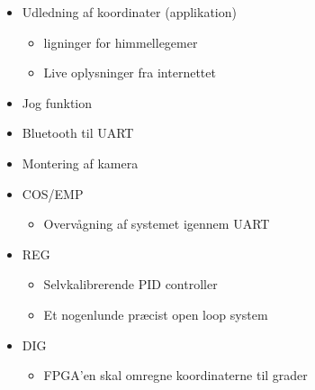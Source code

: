 \begin{itemize}[noitemsep]
	\item Udledning af koordinater (applikation)
	\begin{itemize}[noitemsep]
	\item ligninger for himmellegemer
	\item Live oplysninger fra internettet
	\end{itemize}
	\item Jog funktion
	\item Bluetooth til UART
	\item Montering af kamera
	
	\item COS/EMP
	\begin{itemize}[noitemsep]
	\item Overvågning af systemet igennem UART
	\end{itemize}
	\item REG
	\begin{itemize}[noitemsep]
	\item Selvkalibrerende PID controller
	\item Et nogenlunde præcist open loop system
	\end{itemize}
	\item DIG
	\begin{itemize}[noitemsep]
	\item FPGA'en skal omregne koordinaterne til grader
	\end{itemize}		
	\end{itemize}